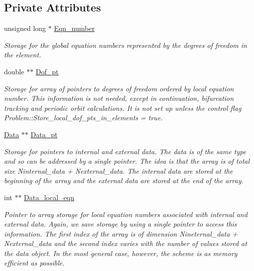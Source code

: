 \subsection*{Private Attributes}
\begin{DoxyCompactItemize}
\item 
unsigned long $\ast$ \hyperlink{classoomph_1_1GeneralisedElement_a26e06e097f06b11892645d725ef85890}{Eqn\+\_\+number}
\begin{DoxyCompactList}\small\item\em Storage for the global equation numbers represented by the degrees of freedom in the element. \end{DoxyCompactList}\item 
double $\ast$$\ast$ \hyperlink{classoomph_1_1GeneralisedElement_ad227e5660854a3bc84a5d18eeabb457c}{Dof\+\_\+pt}
\begin{DoxyCompactList}\small\item\em Storage for array of pointers to degrees of freedom ordered by local equation number. This information is not needed, except in continuation, bifurcation tracking and periodic orbit calculations. It is not set up unless the control flag Problem\+::\+Store\+\_\+local\+\_\+dof\+\_\+pts\+\_\+in\+\_\+elements = true. \end{DoxyCompactList}\item 
\hyperlink{classoomph_1_1Data}{Data} $\ast$$\ast$ \hyperlink{classoomph_1_1GeneralisedElement_acbc80dc7b2800b561b7a016a03031cd3}{Data\+\_\+pt}
\begin{DoxyCompactList}\small\item\em Storage for pointers to internal and external data. The data is of the same type and so can be addressed by a single pointer. The idea is that the array is of total size Ninternal\+\_\+data + Nexternal\+\_\+data. The internal data are stored at the beginning of the array and the external data are stored at the end of the array. \end{DoxyCompactList}\item 
int $\ast$$\ast$ \hyperlink{classoomph_1_1GeneralisedElement_a3b630de826d937b462845ade03c7df9f}{Data\+\_\+local\+\_\+eqn}
\begin{DoxyCompactList}\small\item\em Pointer to array storage for local equation numbers associated with internal and external data. Again, we save storage by using a single pointer to access this information. The first index of the array is of dimension Nineternal\+\_\+data + Nexternal\+\_\+data and the second index varies with the number of values stored at the data object. In the most general case, however, the scheme is as memory efficient as possible. \end{DoxyCompactList}\item 
$$
\end{DoxyCompactItemize}
